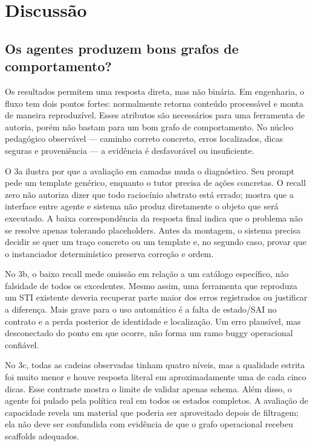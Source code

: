 \documentclass[11pt,a4paper]{article}
\begin{document}
\section{Discussão}

\subsection{Os agentes produzem bons grafos de comportamento?}

Os resultados permitem uma resposta direta, mas não binária. Em engenharia, o fluxo tem dois pontos fortes: normalmente retorna conteúdo processável e monta de maneira reproduzível. Esses atributos são necessários para uma ferramenta de autoria, porém não bastam para um bom grafo de comportamento. No núcleo pedagógico observável --- caminho correto concreto, erros localizados, dicas seguras e proveniência --- a evidência é desfavorável ou insuficiente.

O 3a ilustra por que a avaliação em camadas muda o diagnóstico. Seu prompt pede um template genérico, enquanto o tutor precisa de ações concretas. O recall zero não autoriza dizer que todo raciocínio abstrato está errado; mostra que a interface entre agente e sistema não produz diretamente o objeto que será executado. A baixa correspondência da resposta final indica que o problema não se resolve apenas tolerando placeholders. Antes da montagem, o sistema precisa decidir se quer um traço concreto ou um template e, no segundo caso, provar que o instanciador determinístico preserva correção e ordem.

No 3b, o baixo recall mede omissão em relação a um catálogo específico, não falsidade de todos os excedentes. Mesmo assim, uma ferramenta que reproduza um STI existente deveria recuperar parte maior dos erros registrados ou justificar a diferença. Mais grave para o uso automático é a falta de estado/SAI no contrato e a perda posterior de identidade e localização. Um erro plausível, mas desconectado do ponto em que ocorre, não forma um ramo buggy operacional confiável.

No 3c, todas as cadeias observadas tinham quatro níveis, mas a qualidade estrita foi muito menor e houve resposta literal em aproximadamente uma de cada cinco dicas. Esse contraste mostra o limite de validar apenas schema. Além disso, o agente foi pulado pela política real em todos os estados completos. A avaliação de capacidade revela um material que poderia ser aproveitado depois de filtragem; ela não deve ser confundida com evidência de que o grafo operacional recebeu scaffolds adequados.
\end{document}
